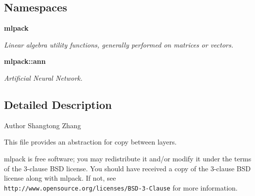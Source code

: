 \subsection*{Namespaces}
\begin{DoxyCompactItemize}
\item 
 \textbf{ mlpack}
\begin{DoxyCompactList}\small\item\em Linear algebra utility functions, generally performed on matrices or vectors. \end{DoxyCompactList}\item 
 \textbf{ mlpack\+::ann}
\begin{DoxyCompactList}\small\item\em Artificial Neural Network. \end{DoxyCompactList}\end{DoxyCompactItemize}


\subsection{Detailed Description}
\begin{DoxyAuthor}{Author}
Shangtong Zhang
\end{DoxyAuthor}
This file provides an abstraction for copy between layers.

mlpack is free software; you may redistribute it and/or modify it under the terms of the 3-\/clause B\+SD license. You should have received a copy of the 3-\/clause B\+SD license along with mlpack. If not, see {\tt http\+://www.\+opensource.\+org/licenses/\+B\+S\+D-\/3-\/\+Clause} for more information. 